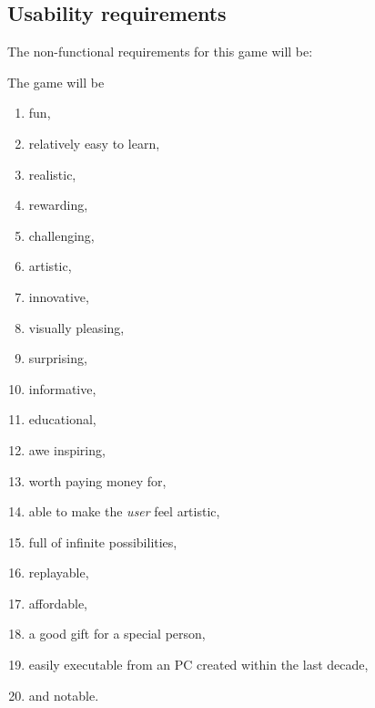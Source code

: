 \subsection*{Usability requirements}

The non-functional requirements for this game will be:

\vspace{4mm}
The game will be
\begin{enumerate}

  \item fun,

  \item relatively easy to learn,

  \item realistic,

  \item rewarding,

  \item challenging,
  
  \item artistic,
  
  \item innovative,
  
  \item visually pleasing,
  
  \item surprising,
  
  \item informative,
  
  \item educational,
  
  \item awe inspiring,
  
  \item worth paying money for,
  
  \item able to make the \emph{user} feel artistic,
  
  \item full of infinite possibilities,

  \item replayable,

  \item affordable,

  \item a good gift for a special person,

  \item easily executable from an PC created within the last decade,

  \item and notable.

\end{enumerate}

